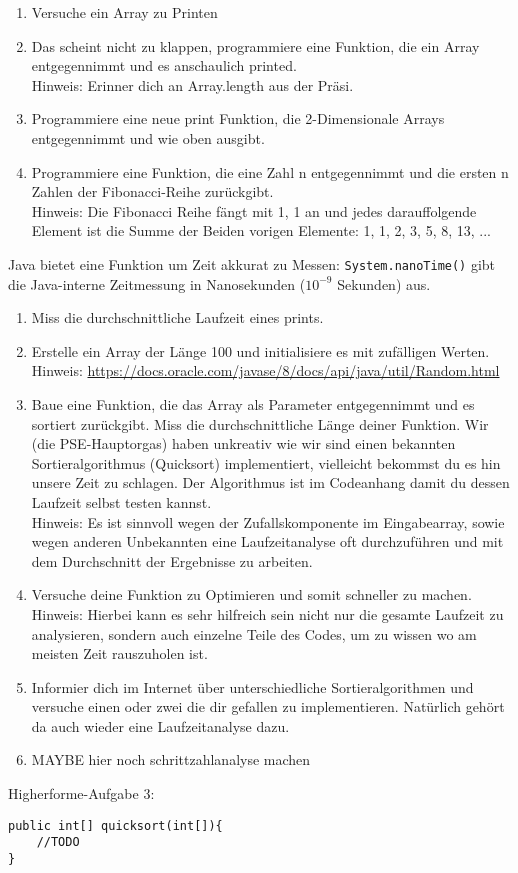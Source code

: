 \documentclass{../../sheet}
\begin{document}
\begin{enumerate}
    \item Versuche ein Array zu Printen
    \item Das scheint nicht zu klappen, programmiere eine Funktion, die ein Array entgegennimmt und es anschaulich printed.\\
    Hinweis: Erinner dich an Array.length aus der Präsi.
    \item Programmiere eine neue print Funktion, die 2-Dimensionale Arrays entgegennimmt und wie oben ausgibt. 
    \item Programmiere eine Funktion, die eine Zahl n entgegennimmt und die ersten n Zahlen der Fibonacci-Reihe zurückgibt.\\
    Hinweis: Die Fibonacci Reihe fängt mit 1, 1 an und jedes darauffolgende Element ist die Summe der Beiden vorigen Elemente: 1, 1, 2, 3, 5, 8, 13, ...

\end{enumerate}

\newpage
{}
Java bietet eine Funktion um Zeit akkurat zu Messen: \texttt{System.nanoTime()} gibt die Java-interne Zeitmessung in Nanosekunden ($10^{-9}$ Sekunden) aus. 
\begin{enumerate}
    \item Miss die durchschnittliche Laufzeit eines prints.
    \item Erstelle ein Array der Länge 100 und initialisiere es mit zufälligen Werten. Hinweis: \url{https://docs.oracle.com/javase/8/docs/api/java/util/Random.html}
    \item Baue eine Funktion, die das Array als Parameter entgegennimmt und es sortiert zurückgibt. Miss die durchschnittliche Länge deiner Funktion. Wir (die PSE-Hauptorgas) haben unkreativ wie wir sind einen bekannten Sortieralgorithmus (Quicksort) implementiert, vielleicht bekommst du es hin unsere Zeit zu schlagen. Der Algorithmus ist im Codeanhang damit du dessen Laufzeit selbst testen kannst. \\
    Hinweis: Es ist sinnvoll wegen der Zufallskomponente im Eingabearray, sowie wegen anderen Unbekannten eine Laufzeitanalyse oft durchzuführen und mit dem Durchschnitt der Ergebnisse zu arbeiten.
    \item Versuche deine Funktion zu Optimieren und somit schneller zu machen. \\
    Hinweis: Hierbei kann es sehr hilfreich sein nicht nur die gesamte Laufzeit zu analysieren, sondern auch einzelne Teile des Codes, um zu wissen wo am meisten Zeit rauszuholen ist. 
    \item Informier dich im Internet über unterschiedliche Sortieralgorithmen und versuche einen oder zwei die dir gefallen zu implementieren. Natürlich gehört da auch wieder eine Laufzeitanalyse dazu.
    \item MAYBE hier noch schrittzahlanalyse machen
\end{enumerate}

\newpage
{}
Higherforme-Aufgabe 3:
\begin{verbatim}
public int[] quicksort(int[]){
    //TODO
}
\end{verbatim}
\end{document}
